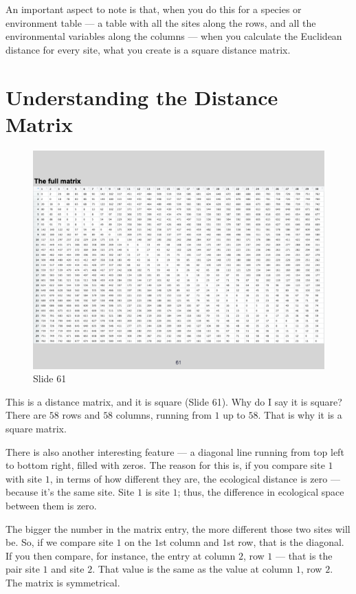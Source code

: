 \documentclass[
  11pt,
]{book}
\begin{document}
An important aspect to note is that, when you do this for a species or
environment table --- a table with all the sites along the rows, and all
the environmental variables along the columns --- when you calculate the
Euclidean distance for every site, what you create is a square distance
matrix.

\section{Understanding the Distance
Matrix}\label{understanding-the-distance-matrix}

\begin{figure}[ht]
\centering
\includegraphics[width=0.8\linewidth]{../images/BDC334/BDC334-061.jpeg}
\caption*{Slide 61}
\end{figure}

This is a distance matrix, and it is square (Slide 61). Why do I say it
is square? There are \(58\) rows and \(58\) columns, running from \(1\)
up to \(58\). That is why it is a square matrix.

There is also another interesting feature --- a diagonal line running
from top left to bottom right, filled with zeros. The reason for this
is, if you compare site \(1\) with site \(1\), in terms of how different
they are, the ecological distance is zero --- because it's the same
site. Site \(1\) is site \(1\); thus, the difference in ecological space
between them is zero.

The bigger the number in the matrix entry, the more different those two
sites will be. So, if we compare site \(1\) on the \(1\)st column and
\(1\)st row, that is the diagonal. If you then compare, for instance,
the entry at column \(2\), row \(1\) --- that is the pair site \(1\) and
site \(2\). That value is the same as the value at column \(1\), row
\(2\). The matrix is symmetrical.
\end{document}
